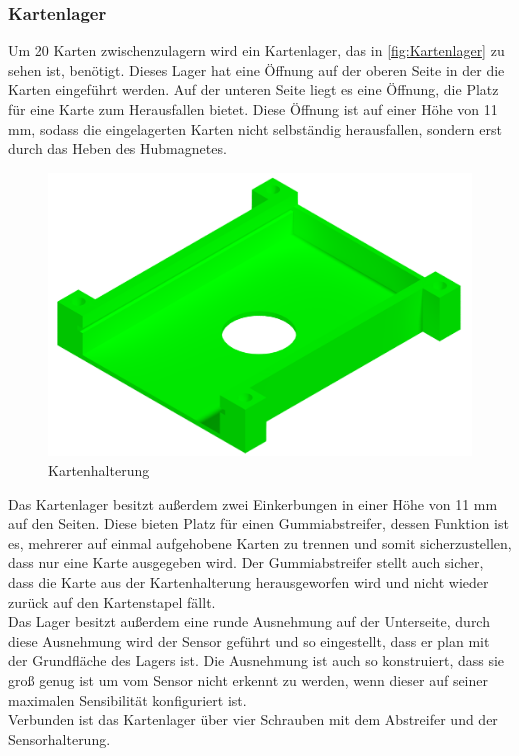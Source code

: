\subsubsection{Kartenlager}

Um 20 Karten zwischenzulagern wird ein Kartenlager, das in \autoref{fig:Kartenlager} zu sehen ist, benötigt.
Dieses Lager hat eine Öffnung auf der oberen Seite in der die Karten eingeführt werden.
Auf der unteren Seite liegt es eine Öffnung, die Platz für eine Karte zum Herausfallen bietet.
Diese Öffnung ist auf einer Höhe von 11 mm, sodass die eingelagerten Karten nicht selbständig herausfallen, sondern erst durch das Heben des Hubmagnetes.\\
\begin{figure}
    \includegraphics[width=8 cm]{fig/mech/Kartenhalterung}
    \caption{Kartenhalterung}
    \label{fig:Kartenlager}
\end{figure}
Das Kartenlager besitzt außerdem zwei Einkerbungen in einer Höhe von 11 mm auf den Seiten.
Diese bieten Platz für einen Gummiabstreifer, dessen Funktion ist es, mehrerer auf einmal aufgehobene Karten zu trennen und somit sicherzustellen, dass nur eine Karte ausgegeben wird.
Der Gummiabstreifer stellt auch sicher, dass die Karte aus der Kartenhalterung herausgeworfen wird und nicht wieder zurück auf den Kartenstapel
fällt. \\
Das Lager besitzt außerdem eine runde Ausnehmung auf der Unterseite, durch diese Ausnehmung wird der Sensor geführt und so eingestellt,
dass er plan mit der Grundfläche des Lagers ist.
Die Ausnehmung ist auch so konstruiert, dass sie groß genug ist um vom Sensor nicht erkennt zu werden, wenn dieser auf seiner maximalen Sensibilität konfiguriert ist.\\
Verbunden ist das Kartenlager über vier Schrauben mit dem Abstreifer und der Sensorhalterung.



